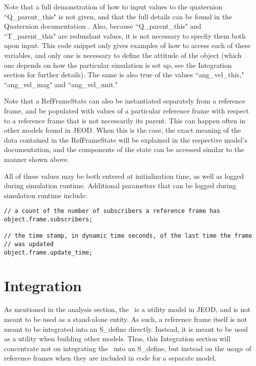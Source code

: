 Note that a full demonstration of how to input values to the quaternion
``Q\_parent\_this" is not given, and that the full details can be found
in the Quaternion documentation \cite{dynenv:QUATERNION}. Also, because
``Q\_parent\_this" and ``T\_parent\_this" are redundant values, it is not
necessary to specfiy them both upon input. This code snippet only gives
examples of how to access each of these variables, and only one is necessary
to define the attitude of the object (which one depends on how the particular
simulation is set up, see the Integration section for further details). The
same is also true of the values ``ang\_vel\_this," ``ang\_vel\_mag" and
``ang\_vel\_unit."

Note that a RefFrameState can also be instantiated separately from a reference
frame, and be populated with values of a particular reference frame with respect
to a reference frame that is not necessarily its parent. This can happen often
in other models found in JEOD. When this is the case, the exact meaning of
the data contained in the RefFrameState will be explained in the respective
model's documentation, and the components of the state can be accessed similar
to the manner shown above.

All of these values may be both entered at initialization time, as well
as logged during simulation runtime. Additional parameters that can be logged
during simulation runtime include:

\begin{verbatim}
// a count of the number of subscribers a reference frame has
object.frame.subscribers;

// the time stamp, in dynamic time seconds, of the last time the frame
// was updated
object.frame.update_time;
\end{verbatim}

\section{Integration}

As mentioned in the analysis section, the \ is a utility model
in JEOD, and is not meant to be used as a stand-alone entity. As such,
a reference frame itself is not meant to be integrated into an S\_define directly.
Instead, it is meant to be used as a utility when building other models.
Thus, this Integration section will concentrate not on integrating the
\ into an S\_define, but instead on the usage of reference
frames when they are included in code for a separate model.

